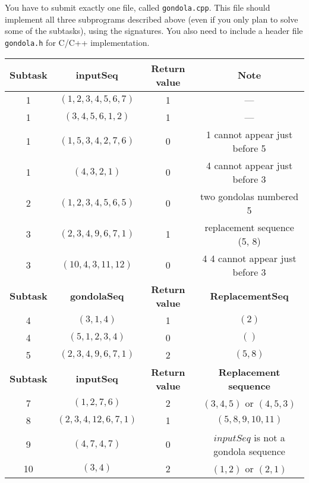 You have to submit exactly one file, called \texttt{gondola.cpp}. This file should implement all three subprograms described above (even if you only plan to solve some of the
subtasks), using the signatures. You also need to include a header file \texttt{gondola.h} for C/C++ implementation.

\begin{center}
\renewcommand{\arraystretch}{1.5}
\begin{tabular}{|c|c|c|c|}
\hline
\textbf{Subtask} & \textbf{inputSeq} & \parbox{2.8cm}{\centering \vspace{2mm}\textbf{Return value}\\\vspace{2mm}} & \textbf{Note} \\
 & $(1, 2, 3, 4, 5, 6, 7)$ & 1 & --- \\
 & $(3, 4, 5, 6, 1, 2)$ & 1 & --- \\
 & $(1, 5, 3, 4, 2, 7, 6)$ & 0 & 1 cannot appear just before 5 \\
 & $(4, 3, 2, 1)$ & 0 & 4 cannot appear just before 3 \\
 & $(1, 2, 3, 4, 5, 6, 5)$ & 0 & two gondolas numbered 5 \\
 & $(2, 3, 4, 9, 6, 7, 1)$ & 1 & replacement sequence (5, 8) \\
 & $(10, 4, 3, 11, 12)$ & 0 & 4 4 cannot appear just before 3 \\
\hline
\textbf{Subtask} & \textbf{gondolaSeq} & \parbox{2.8cm}{\centering \vspace{2mm}\textbf{Return value}\\\vspace{2mm}} & \textbf{ReplacementSeq} \\
 & $(3, 1, 4)$ & 1 & $(2)$ \\
 & $(5, 1, 2, 3, 4)$ & 0 & $()$ \\
 & $(2, 3, 4, 9, 6, 7, 1)$ & 2 & $(5, 8)$ \\
\hline
\textbf{Subtask} & \textbf{inputSeq} & \parbox{2.8cm}{\centering \vspace{2mm}\textbf{Return value}\\\vspace{2mm}} & \textbf{Replacement sequence} \\
 & $(1, 2, 7, 6)$ & 2 & $(3, 4, 5)$ or $(4, 5, 3)$ \\
 & $(2, 3, 4, 12, 6, 7, 1)$ & 1 & $(5, 8, 9, 10, 11)$ \\
 & $(4, 7, 4, 7)$ & 0 & $inputSeq$ is not a gondola sequence \\
 & $(3, 4)$ & 2 & $(1, 2)$ or $(2, 1)$ \\
\hline
\end{tabular}
\end{center}
